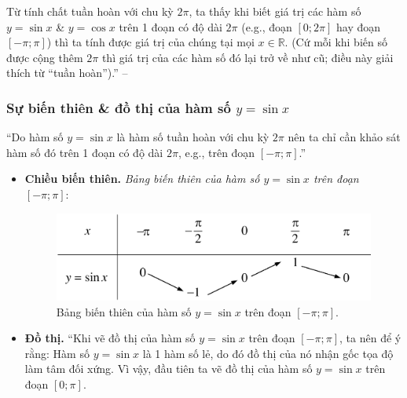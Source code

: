 \documentclass[oneside]{book}
\numberwithin{equation}{section}
\begin{document}
Từ tính chất tuần hoàn với chu kỳ $2\pi$, ta thấy khi biết giá trị các hàm số $y = \sin x$ \& $y = \cos x$ trên 1 đoạn có độ dài $2\pi$ (e.g., đoạn $[0;2\pi]$ hay đoạn $[-\pi;\pi]$) thì ta tính được giá trị của chúng tại mọi $x\in\mathbb{R}$. (Cứ mỗi khi biến số được cộng thêm $2\pi$ thì giá trị của các hàm số đó lại trở về như cũ; điều này giải thích từ ``tuần hoàn'').'' -- \cite[p. 4--5]{SGK_Toan_11_dai_so_giai_tich_nang_cao}

\subsubsection{Sự biến thiên \& đồ thị của hàm số $y = \sin x$}
``Do hàm số $y = \sin x$ là hàm số tuần hoàn với chu kỳ $2\pi$ nên ta chỉ cần khảo sát hàm số đó trên 1 đoạn có độ dài $2\pi$, e.g., trên đoạn $[-\pi;\pi]$.''
\begin{itemize}
	\item \textbf{Chiều biến thiên.} \textit{Bảng biến thiên của hàm số $y = \sin x$ trên đoạn $[-\pi;\pi]$}:
	
	\begin{figure}[H]
		\centering
		\includegraphics[scale=0.15]{bang_bien_thien_sin}
		\caption{Bảng biến thiên của hàm số $y = \sin x$ trên đoạn $[-\pi;\pi]$.}
	\end{figure}
	
	\item \textbf{Đồ thị.} ``Khi vẽ đồ thị của hàm số $y = \sin x$ trên đoạn $[-\pi;\pi]$, ta nên để ý rằng: Hàm số $y = \sin x$ là 1 hàm số lẻ, do đó đồ thị của nó nhận gốc tọa độ làm tâm đối xứng. Vì vậy, đầu tiên ta vẽ đồ thị của hàm số $y = \sin x$ trên đoạn $[0;\pi]$.
	

\end{itemize}
\end{document}
